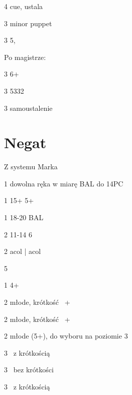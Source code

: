 \documentclass[12pt, a4paper]{report}
\begin{document}
\sequence{{2\ntx}{3\diams}{3\hearts}}
\begin{options}[2]
    \item[4\minor] cue, ustala \hearts
    \item[3\spades] \nt \then minor puppet
    \item[3\nt] 5\spades, \fonce
\end{options}

Po magistrze:
\begin{options}[2]
    \item[3\major] 6+ \inv
    \item[3\nt] 5332
\end{options}

\begin{options}[2]
    \item[3\major] samoustalenie \gf
\end{options}

\section{Negat}
Z systemu Marka

\sequence{{1\clubs}{1\diams}}
\begin{options}[1]
    \item[1\hearts] dowolna ręka w miarę BAL do 14PC \vimp
    \item[1\spades] 15+ 5+\clubs \vimp
    \item[1\nt] 18-20 BAL
    \item[2\clubs] 11-14 6\clubs  
    \item[2\diams] acol \clubs | acol \clubs\diams \imp
\end{options}

\sequence{{1\clubs}{1\diams}{1\hearts}}
\begin{options}[2]
    \item[\pass] 5\hearts
    \item[1\spades] 4+\spades 
    \item[2\hearts] młode, krótkość \hearts\ \inv+
    \item[2\spades] młode, krótkość \spades\ \inv+
    \item[2\nt] młode (5+\clubs), do wyboru na poziomie 3
    \item[3\clubs] \gf\ \diams z krótkością \clubs
    \item[3\diams] \gf\ \diams bez krótkości
    \item[3\major] \gf\ \diams z krótkością   
\end{options}
\end{document}
